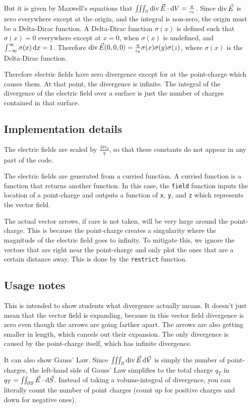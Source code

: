 But it is given by Maxwell's equations that \(\iiint_S \divf \vec E \cdot \dif V = \frac{q}{\epsilon_0}\). Since \(\operatorname{div} \vec E\) is zero everywhere except at the origin, and the integral is non-zero, the origin must be a Delta-Dirac function. A Delta-Dirac function \(\sigma (x)\) is defined such that \(\sigma (x) = 0\) everywhere except at \(x = 0\), when \(\sigma(x)\) is undefined, and \(\int_{-\infty}^\infty \sigma(x) \dif x = 1\).  Therefore \(\operatorname{div} \vec E (0, 0, 0) = \frac{q}{\epsilon_0} \sigma(x)\sigma(y)\sigma(z)\), where \(\sigma(x)\) is the Delta-Dirac function.

Therefore electric fields have zero divergence except for at the point-charge which causes them. At that point, the divergence is infinite. The integral of the divergence of the electric field over a surface is just the number of charges contained in that surface.

\subsection*{Implementation details}

The electric fields are scaled by \(\frac{4 \pi \epsilon_0}{q}\), so that these constants do not appear in any part of the code.

The electric fields are generated from a curried function. A curried function is a function that returns another function. In this case, the \verb+field+ function inputs the location of a point-charge and outputs a function of \verb+x+, \verb+y+, and \verb+z+ which represents the vector field.

The actual vector arrows, if care is not taken, will be very large around the point-charge. This is because the point-charge creates a singularity where the magnitude of the electric field goes to infinity. To mitigate this, we ignore the vectors that are right near the point-charge and only plot the ones that are a certain distance away. This is done by the \verb+restrict+ function.

\subsection*{Usage notes}

This is intended to show students what divergence actually means. It doesn't just mean that the vector field is expanding, because in this vector field divergence is zero even though the arrows are going farther apart. The arrows are also getting smaller in length, which cancels out their expansion. The only divergence is caused by the point-charge itself, which has infinite divergence.

It can also show Gauss' Law. Since \(\iiint_S \divf \vec E \dif \vec V\) is simply the number of point-charges, the left-hand side of Gauss' Law simplifies to the total charge \(q_T\) in \(q_T = \iint_{\partial S} \vec E \cdot \dif \vec S\). Instead of taking a volume-integral of divergence, you can literally count the number of point charges (count up for positive charges and down for negative ones).
